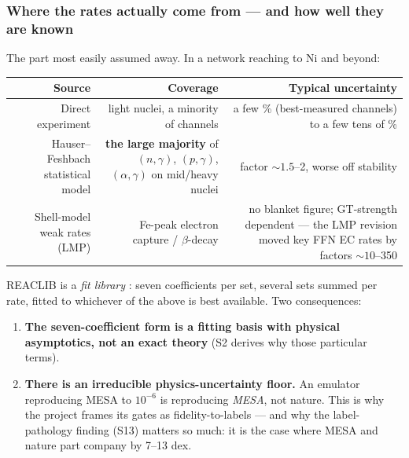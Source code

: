\subsubsection{Where the rates actually come from --- and how well they are known}
\label{sec:ratesources}

The part most easily assumed away. In a network reaching to Ni and beyond:

\begin{center}
\small
\begin{tabularx}{\textwidth}{@{}R{0.75} R{1.05} R{1.20}@{}}
\toprule
\textbf{Source} & \textbf{Coverage} & \textbf{Typical uncertainty} \\
\midrule
Direct experiment &
  light nuclei, a minority of channels &
  a few \% (best-measured channels) to a few tens of \%
  \citep{iliadis2010} \\
Hauser--Feshbach statistical model &
  \textbf{the large majority} of $(n,\gamma)$, $(p,\gamma)$, $(\alpha,\gamma)$
  on mid/heavy nuclei &
  factor ${\sim}1.5$--2, worse off stability \citep{rauscher2000} \\
Shell-model weak rates (LMP) &
  Fe-peak electron capture / $\beta$-decay &
  no blanket figure; GT-strength dependent --- the LMP revision moved key FFN
  EC rates by factors ${\sim}10$--350 \citep{langanke2000} \\
\bottomrule
\end{tabularx}
\end{center}

REACLIB is a \emph{fit library} \citep{cyburt2010}: seven coefficients per set,
several sets summed per rate, fitted to whichever of the above is best
available. Two consequences:

\begin{enumerate}
\item \textbf{The seven-coefficient form is a fitting basis with physical
      asymptotics, not an exact theory} (S2 derives why those particular
      terms).
\item \textbf{There is an irreducible physics-uncertainty floor.} An emulator
      reproducing MESA to $10^{-6}$ is reproducing \emph{MESA}, not nature.
      This is why the project frames its gates as fidelity-to-labels --- and
      why the label-pathology finding (S13) matters so much: it is the case
      where MESA and nature part company by 7--13 dex.
\end{enumerate}

